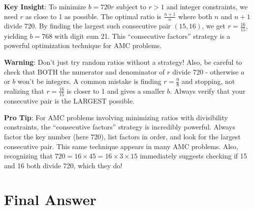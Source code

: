 \documentclass[11pt]{article}
\begin{document}
\begin{keyinsightbox}
\textbf{Key Insight}: To minimize $b = 720r$ subject to $r > 1$ and integer constraints, we need $r$ as close to 1 as possible. The optimal ratio is $\frac{n+1}{n}$ where both $n$ and $n+1$ divide 720. By finding the largest such consecutive pair $(15, 16)$, we get $r = \frac{16}{15}$, yielding $b = 768$ with digit sum 21. This ``consecutive factors'' strategy is a powerful optimization technique for AMC problems.
\end{keyinsightbox}

\begin{warningbox}
\textbf{Warning}: Don't just try random ratios without a strategy! Also, be careful to check that BOTH the numerator and denominator of $r$ divide 720 - otherwise $a$ or $b$ won't be integers. A common mistake is finding $r = \frac{9}{8}$ and stopping, not realizing that $r = \frac{16}{15}$ is closer to 1 and gives a smaller $b$. Always verify that your consecutive pair is the LARGEST possible.
\end{warningbox}

\begin{tipbox}
\textbf{Pro Tip}: For AMC problems involving minimizing ratios with divisibility constraints, the ``consecutive factors'' strategy is incredibly powerful. Always factor the key number (here 720), list factors in order, and look for the largest consecutive pair. This same technique appears in many AMC problems. Also, recognizing that $720 = 16 \times 45 = 16 \times 3 \times 15$ immediately suggests checking if 15 and 16 both divide 720, which they do!
\end{tipbox}

\section*{Final Answer}

\end{document}
